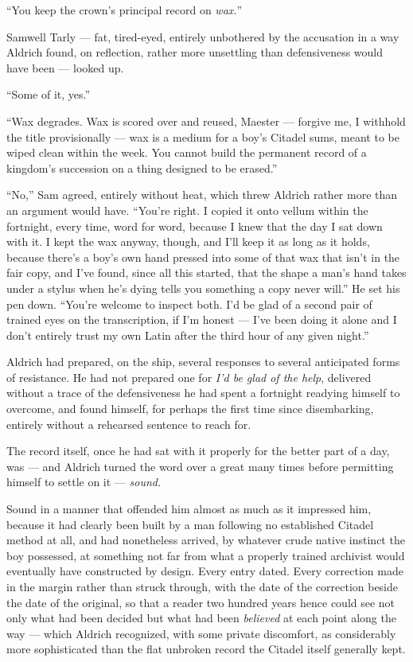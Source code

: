 “You keep the crown’s principal record on \textit{wax.}”

Samwell Tarly — fat, tired-eyed, entirely unbothered by the accusation in a way Aldrich found, on reflection, rather more unsettling than defensiveness would have been — looked up.

“Some of it, yes.”

“Wax degrades. Wax is scored over and reused, Maester — forgive me, I withhold the title provisionally — wax is a medium for a boy’s Citadel sums, meant to be wiped clean within the week. You cannot build the permanent record of a kingdom’s succession on a thing designed to be erased.”

“No,” Sam agreed, entirely without heat, which threw Aldrich rather more than an argument would have. “You’re right. I copied it onto vellum within the fortnight, every time, word for word, because I knew that the day I sat down with it. I kept the wax anyway, though, and I’ll keep it as long as it holds, because there’s a boy’s own hand pressed into some of that wax that isn’t in the fair copy, and I’ve found, since all this started, that the shape a man’s hand takes under a stylus when he’s dying tells you something a copy never will.” He set his pen down. “You’re welcome to inspect both. I’d be glad of a second pair of trained eyes on the transcription, if I’m honest — I’ve been doing it alone and I don’t entirely trust my own Latin after the third hour of any given night.”

Aldrich had prepared, on the ship, several responses to several anticipated forms of resistance. He had not prepared one for \textit{I’d be glad of the help}, delivered without a trace of the defensiveness he had spent a fortnight readying himself to overcome, and found himself, for perhaps the first time since disembarking, entirely without a rehearsed sentence to reach for.

\sceneBreak

The record itself, once he had sat with it properly for the better part of a day, was — and Aldrich turned the word over a great many times before permitting himself to settle on it — \textit{sound.}

Sound in a manner that offended him almost as much as it impressed him, because it had clearly been built by a man following no established Citadel method at all, and had nonetheless arrived, by whatever crude native instinct the boy possessed, at something not far from what a properly trained archivist would eventually have constructed by design. Every entry dated. Every correction made in the margin rather than struck through, with the date of the correction beside the date of the original, so that a reader two hundred years hence could see not only what had been decided but what had been \textit{believed} at each point along the way — which Aldrich recognized, with some private discomfort, as considerably more sophisticated than the flat unbroken record the Citadel itself generally kept.

